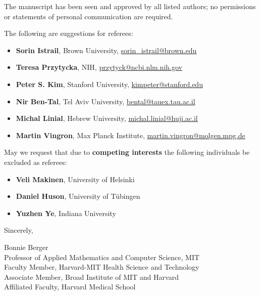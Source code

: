 \documentclass{article}
\newcommand{\email}[1]{\href{mailto:#1}{#1} }
\begin{document}
The manuscript has been seen and approved by all listed authors; no permissions or statements of personal communication are required.

The following are suggestions for referees:
\begin{itemize}
\item[] \textbf{Sorin Istrail}, Brown University, \email{sorin\_istrail@brown.edu}  %
\item[] \textbf{Teresa Przytycka}, NIH, \email{przytyck@ncbi.nlm.nih.gov}  %
\item[] \textbf{Peter S. Kim}, Stanford University, \email{kimpeter@stanford.edu} %
\item[] \textbf{Nir Ben-Tal}, Tel Aviv University, \email{bental@tauex.tau.ac.il} %
\item[] \textbf{Michal Linial}, Hebrew University, \email{michal.linial@huji.ac.il}
\item[] \textbf{Martin Vingron}, Max Planck Institute, \email{martin.vingron@molgen.mpg.de}
\end{itemize}

May we request that due to \textbf{competing interests} the following individuals be excluded as referees:
\begin{itemize}
\item[] \textbf{Veli Makinen}, University of Helsinki
\item[] \textbf{Daniel Huson}, University of T\"ubingen
\item[] \textbf{Yuzhen Ye}, Indiana University
\end{itemize}


Sincerely,

Bonnie Berger  \\
Professor of Applied Mathematics and Computer Science, MIT  \\
Faculty Member, Harvard-MIT Health Science and Technology\\
Associate Member, Broad Institute of MIT and Harvard \\
Affiliated Faculty, Harvard Medical School
\end{document}
